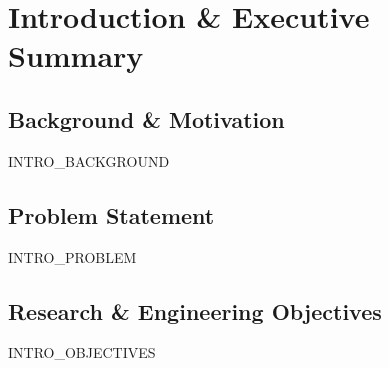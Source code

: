 
\chapter{Introduction \& Executive Summary}

\section{Background \& Motivation}
{{INTRO_BACKGROUND}}

\section{Problem Statement}
{{INTRO_PROBLEM}}

\section{Research \& Engineering Objectives}
{{INTRO_OBJECTIVES}}
